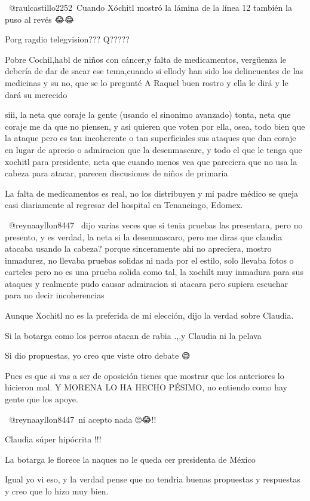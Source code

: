​ @raulcastillo2252 Cuando Xóchitl mostró la lámina de la línea 12 también la puso al revés 😂😂

Porg ragdio telegvision??? Q?????

Pobre Cochil,habl de niños con cáncer,y falta de medicamentos, vergüenza le debería de dar de sacar ese tema,cuando si ellody han sido los delincuentes de las medicinas y su no, que se lo pregunté A Raquel buen rostro y ella le dirá y le dará su merecido

siii, la neta que coraje la gente (usando el sinonimo avanzado) tonta, neta que coraje me da que no piensen, y asi quieren que voten por ella, osea, todo bien que la ataque pero es tan incoherente o tan superficiales sus ataques que dan coraje en lugar de aprecio o admiracion que la desenmascare, y todo el que le tenga que xochitl para presidente, neta que cuando menos vea que pareciera que no usa la cabeza para atacar, parecen discusiones de niños de primaria

La falta de medicamentos es real, no los distribuyen y mi padre médico se queja casi diariamente al regresar del hospital en Tenancingo, Edomex.

 @reynaayllon8447  dijo varias veces que si tenia pruebas las presentara, pero no presento, y es verdad, la neta si la desenmascaro, pero me diras que claudia atacaba usando la cabeza? porque sinceramente ahi no apreciera, mostro inmadurez, no llevaba pruebas solidas ni nada por el estilo, solo llevaba fotos o carteles pero no es una prueba solida como tal, la xochilt muy inmadura para sus ataques y realmente pudo causar admiracion si atacara pero supiera escuchar para no decir incoherencias

Aunque Xochitl no es la preferida de mi elección, dijo la verdad sobre Claudia.

Si la botarga como los perros atacan de rabia .,.y Claudia ni la pelava

Si dio propuestas, yo creo que viste otro debate 😅

Pues es que si vas a ser de oposición tienes que mostrar que los anteriores lo hicieron mal. Y MORENA LO HA HECHO PÉSIMO, no entiendo como hay gente que los apoye.

 @reynaayllon8447 ni acepto nada 🙄😂!!

Claudia súper hipócrita !!!

La botarga le florece la naques no le queda cer presidenta de México

Igual yo vi eso, y la verdad pense que no tendria buenas propuestas y respuestas y creo que lo hizo muy bien.

